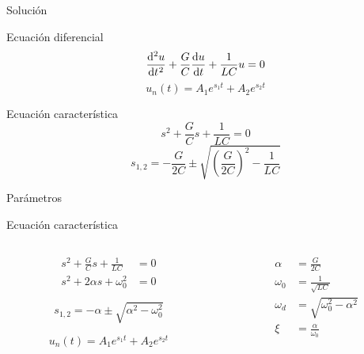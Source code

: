 \documentclass[aspectratio=169, usenames,svgnames,dvipsnames]{beamer}
\begin{document}
\begin{frame}[label={sec:org8a5cda6}]{Solución}
\begin{block}{Ecuación diferencial}
\[
  \diff[2]{u}{t} + \frac{G}{C} \diff{u}{t} + \frac{1}{LC} u = 0
\]
\[
  u_n(t) = A_1 e^{s_1 t} + A_2 e^{s_2 t}
\]
\end{block}

\begin{block}{Ecuación característica}
\[
s^2 + \frac{G}{C} s + \frac{1}{LC} = 0  
\]
\[
  s_{1,2} = -\frac{G}{2C} \pm \sqrt{\left(\frac{G}{2C}\right)^2 - \frac{1}{LC}}
\]
\end{block}
\end{frame}


\begin{frame}[label={sec:org5707784}]{Parámetros}
\begin{block}{Ecuación característica}
\begin{columns}
\begin{column}{.5\columnwidth}
\begin{align*}
s^2 + \frac{G}{C} s + \frac{1}{LC} &= 0\\
s^2 + 2\alpha s + \omega_0^2 &= 0  
\end{align*}

\[
  s_{1,2} = -\alpha \pm \sqrt{\alpha^2 - \omega_0^2}
\]

\[
  u_n(t) = A_1 e^{s_1 t} + A_2 e^{s_2 t}
\]
\end{column}
\begin{column}{.5\columnwidth}
\begin{align*}
  \alpha &= \frac{G}{2C}\\
  \omega_0 &= \frac{1}{\sqrt{LC}}\\
  \omega_d &= \sqrt{\omega_0^2 - \alpha^2}\\
  \xi &= \frac{\alpha}{\omega_0}
\end{align*}
\end{column}
\end{columns}
\end{block}
\end{frame}
\end{document}
